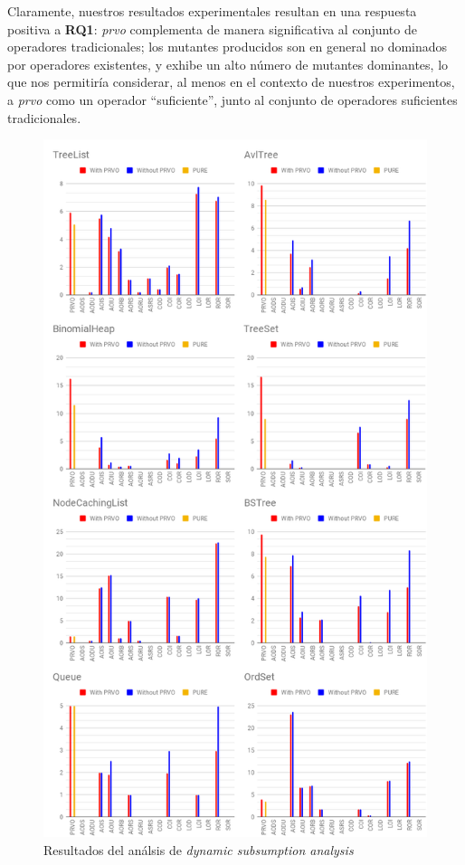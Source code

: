 Claramente, nuestros resultados experimentales resultan en una respuesta positiva a \textbf{RQ1}: \emph{prvo} complementa de manera significativa al conjunto de operadores tradicionales; los mutantes producidos son en general no dominados por operadores existentes, y exhibe un alto n\'umero de mutantes dominantes, lo que nos permitir\'ia considerar, al menos en el contexto de nuestros experimentos, a \emph{prvo} como un operador ``suficiente'', junto al conjunto de operadores suficientes tradicionales.

\begin{figure}[t]
	\begin{center}
		\includegraphics[width=12cm]{figures/Tables.png}
	\end{center}
	\caption{Resultados del an\'alsis de \emph{dynamic subsumption analysis}}
	\label{subsumption-results}
\end{figure}


